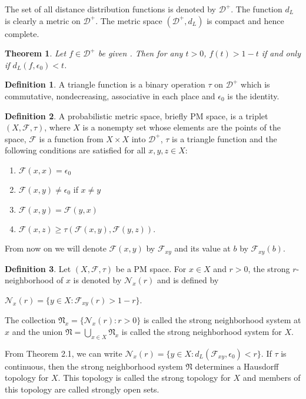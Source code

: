 \documentclass[reqno,b5paper]{amsart}
\theoremstyle{plain}
\newtheorem{thm}{Theorem}[section]
\theoremstyle{definition}
\newtheorem{defn}{Definition}[section]
\begin{document}
The set of all distance distribution functions is denoted by
$\mathcal{D}^{+}$. The function $d_{L}$ is clearly a metric on
$\mathcal{D}^{+}$. The metric space $(\mathcal{D}^{+},d_{L})$ is
compact and hence complete.
\begin{thm}
Let $f\in\mathcal{D}^{+}$ be given . Then for any $t>0$,
$f(t)>1-t$ if and only if $d_{L}(f,\epsilon_{0})<t$.
\end{thm}
\begin{defn}
A triangle function is a binary operation $\tau$ on
$\mathcal{D}^{+}$ which is commutative, nondecreasing, associative
in each place and $\epsilon_{0}$ is the identity.
\end{defn}
\begin{defn}
A probabilistic metric space, briefly PM space, is a triplet
$(X,\mathcal{F},\tau)$, where $X$ is a nonempty set whose elements
are the points of the space, $\mathcal{F}$ is a function from
$X\times X$ into $\mathcal{D}^{+}$, $\tau$ is a triangle function
and the following conditions are satisfied for all $x,y,z\in X$:
    \begin{enumerate}
    \item $\mathcal{F}(x,x)=\epsilon_{0}$
    \item $\mathcal{F}(x,y)\neq\epsilon_{0}$ if $x\neq y $
    \item $\mathcal{F}(x,y)=\mathcal{F}(y,x) $
    \item $ \mathcal{F}(x,z)\geq \tau(\mathcal{F}(x,y),\mathcal{F}(y,z))$.
    \end{enumerate}
From now on we will denote $\mathcal{F}(x,y)$ by
$\mathcal{F}_{xy}$ and its value at $b$ by $\mathcal{F}_{xy}(b)$.
\end{defn}
\begin{defn}
Let $(X,\mathcal{F},\tau)$ be a PM space. For $x\in X$ and $r>0$,
the strong $r$-neighborhood of $x$ is denoted by
$\mathcal{N}_{x}(r)$ and is defined by
\begin{center}
$\mathcal{N}_{x}(r)=\{y\in X : \mathcal{F}_{xy}(r)>1-r\} $.
\end{center}
The collection $\mathfrak{N}_{x}=\{\mathcal{N}_{x}(r):r>0 \}$ is
called the strong neighborhood system at $x$ and the union
$\mathfrak{N}=\underset{x\in X}{\bigcup}\mathfrak{N}_{x}$ is
called the strong neighborhood system for $ X $.
\end{defn}
From Theorem 2.1, we can write $\mathcal{N}_{x}(r)=\{y\in X :
d_{L}(\mathcal{F}_{xy},\epsilon_{0})<r\} $. If $\tau$ is
continuous, then the strong neighborhood system $\mathfrak{N}$
determines a Hausdorff topology for $X$. This topology is called
the strong topology for $X$ and members of this topology are
called strongly open sets.
\end{document}
